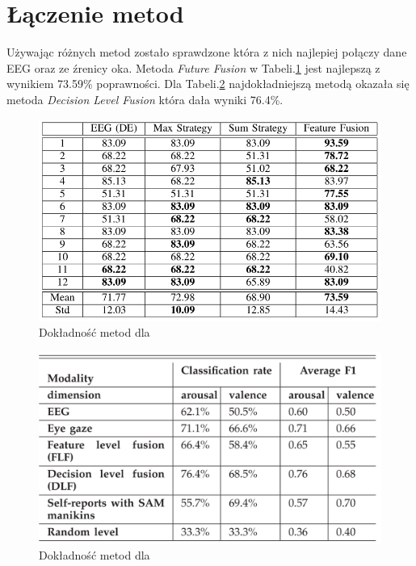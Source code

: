 \documentclass[10pt,journal,compsoc,twoside]{IEEEtran}
\begin{document}
\section{Łączenie metod}
Używając różnych metod zostało sprawdzone która z nich najlepiej połączy dane EEG oraz ze źrenicy oka. Metoda \textit{Future Fusion} w Tabeli.\ref{fig:WeiLongBoNanBaoLiang2014} jest najlepszą z wynikiem 73.59\% poprawności.
Dla Tabeli.\ref{fig:SoleymaniPanticPun2002} najdokładniejszą metodą okazała się metoda \textit{Decision Level Fusion} która dała wyniki 76.4\%. 
\begin{figure}[htp]
	\caption{Dokładność metod dla \cite{WeiLongBoNanBaoLiang2014}}

		\label{fig:WeiLongBoNanBaoLiang2014}
		\includegraphics[scale=0.40]{weiLongConclision}
\end{figure}

\begin{figure}[htp]
		\caption{Dokładność metod dla \cite{SoleymaniPanticPun2002}}
	
		\label{fig:SoleymaniPanticPun2002}
		\includegraphics[scale=0.26]{mohammedConclusion}
	
	
\end{figure}
\end{document}
